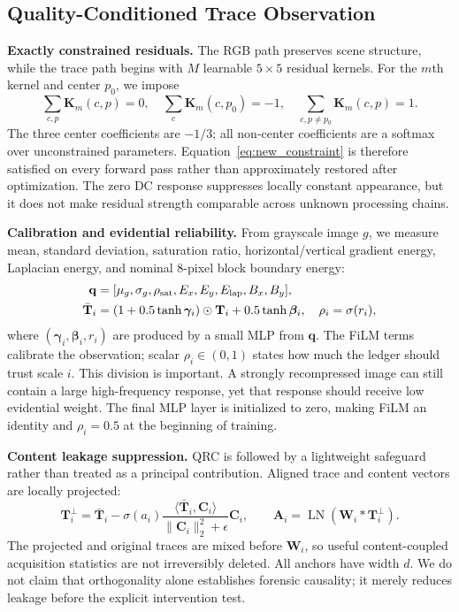 \subsection{Quality-Conditioned Trace Observation}
\label{sec:qrc}

\textbf{Exactly constrained residuals.}
The RGB path preserves scene structure, while the trace path begins with $M$
learnable $5\!\times\!5$ residual kernels. For the $m$th kernel and center
$p_0$, we impose
\begin{equation}
\sum_{c,p}\mathbf K_m(c,p)=0,\quad
\sum_c\mathbf K_m(c,p_0)=-1,\quad
\sum_{c,p\ne p_0}\mathbf K_m(c,p)=1.
\label{eq:new_constraint}
\end{equation}
The three center coefficients are $-1/3$; all non-center coefficients are a
softmax over unconstrained parameters. Equation~\eqref{eq:new_constraint} is
therefore satisfied on every forward pass rather than approximately restored
after optimization. The zero DC response suppresses locally constant appearance,
but it does not make residual strength comparable across unknown processing
chains.

\textbf{Calibration and evidential reliability.}
From grayscale image $g$, we measure mean, standard deviation, saturation ratio,
horizontal/vertical gradient energy, Laplacian energy, and nominal 8-pixel block
boundary energy:
\begin{equation}
\begin{split}
\mathbf q&=[\mu_g,\sigma_g,\rho_{\rm sat},E_x,E_y,E_{\rm lap},B_x,B_y],\\
\bar{\mathbf T}_i&=(1+0.5\tanh\bm\gamma_i)\odot\mathbf T_i
                  +0.5\tanh\bm\beta_i,\quad
\rho_i=\sigma(r_i),
\end{split}
\label{eq:new_quality}
\end{equation}
where $(\bm\gamma_i,\bm\beta_i,r_i)$ are produced by a small MLP from $\mathbf q$.
The FiLM terms calibrate the observation; scalar $\rho_i\in(0,1)$ states how much
the ledger should trust scale $i$. This division is important. A strongly
recompressed image can still contain a large high-frequency response, yet that
response should receive low evidential weight. The final MLP layer is initialized
to zero, making FiLM an identity and $\rho_i=0.5$ at the beginning of training.

\textbf{Content leakage suppression.}
QRC is followed by a lightweight safeguard rather than treated as a principal
contribution. Aligned trace and content vectors are locally projected:
\begin{equation}
\mathbf T_i^\perp=\bar{\mathbf T}_i-\sigma(a_i)
\frac{\langle\bar{\mathbf T}_i,\mathbf C_i\rangle}
{\|\mathbf C_i\|_2^2+\epsilon}\mathbf C_i,\qquad
\mathbf A_i=\operatorname{LN}(\mathbf W_i*\mathbf T_i^\perp).
\label{eq:new_orth_anchor}
\end{equation}
The projected and original traces are mixed before $\mathbf W_i$, so useful
content-coupled acquisition statistics are not irreversibly deleted. All anchors
have width $d$. We do not claim that orthogonality alone establishes forensic
causality; it merely reduces leakage before the explicit intervention test.

